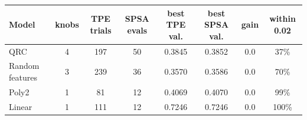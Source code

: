 \begin{tabular}{lccccccc}
\toprule
Model & knobs & TPE trials & SPSA evals & best TPE val. & best SPSA val. & gain & within 0.02 \\
\midrule
QRC & 4 & 197 & 50 & 0.3845 & 0.3852 & 0.0 & 37\% \\
Random features & 3 & 239 & 36 & 0.3570 & 0.3586 & 0.0 & 70\% \\
Poly2 & 1 & 81 & 12 & 0.4069 & 0.4070 & 0.0 & 99\% \\
Linear & 1 & 111 & 12 & 0.7246 & 0.7246 & 0.0 & 100\% \\
\bottomrule
\end{tabular}
